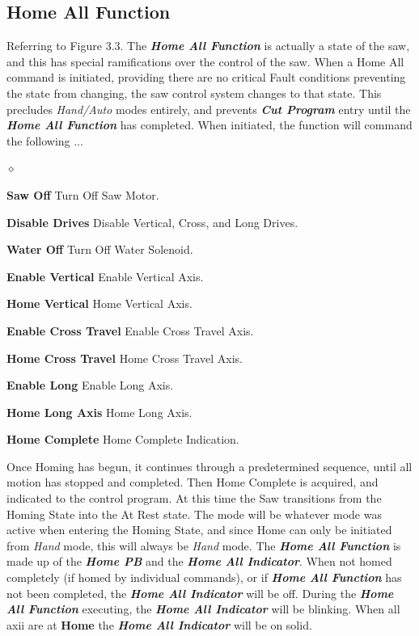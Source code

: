 \subsection{Home All Function} Referring to Figure 3.3. The \textbf{\textit{Home All Function}} is actually a state of the saw, and this has special ramifications over the control of the saw. When a Home All command is initiated, providing there are no critical Fault conditions preventing the state from changing, the saw control system changes to that state. This precludes \textit{Hand/Auto} modes entirely, and prevents \textit{\textbf{Cut Program}} entry until the \textit{\textbf{Home All Function}} has completed. When initiated, the function will command the following ...
\begin{list}{$\diamond$}{}
	\item \textbf{Saw Off} Turn Off Saw Motor.
	\item \textbf{Disable Drives} Disable Vertical, Cross, and Long Drives.
	\item \textbf{Water Off} Turn Off Water Solenoid.
	\item \textbf{Enable Vertical} Enable Vertical Axis.
	\item \textbf{Home Vertical} Home Vertical Axis.
	\item \textbf{Enable Cross Travel} Enable Cross Travel Axis.
	\item \textbf{Home Cross Travel} Home Cross Travel Axis.
	\item \textbf{Enable Long} Enable Long Axis.
	\item \textbf{Home Long Axis} Home Long Axis.
	\item \textbf{Home Complete} Home Complete Indication.
\end{list}
Once Homing has begun, it continues through a predetermined sequence, until all motion has stopped and completed. Then Home Complete is acquired, and indicated to the control program. At this time the Saw transitions from the Homing State into the At Rest state. The mode will be whatever mode was active when entering the Homing State, and since Home can only be initiated from \textit{Hand} mode, this will always be \textit{Hand} mode. The \textbf{\textit{Home All Function}} is made up of the \textbf{\textit{Home PB}} and the \textbf{\textit{Home All Indicator}}. When not homed completely (if homed by individual commands), or if \textbf{\textit{Home All Function}} has not been completed, the \textbf{\textit{Home All Indicator}} will be off. During the \textbf{\textit{Home All Function}} executing, the \textbf{\textit{Home All Indicator}} will be blinking. When all axii are at \textbf{Home} the \textbf{\textit{Home All Indicator}} will be on solid.
